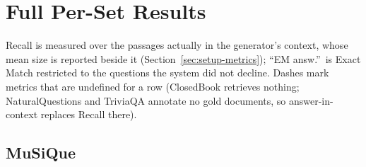 \appendix

\section{Full Per-Set Results}
\label{app:full-tables}

Recall is measured over the passages actually in the generator's context,
whose mean size is reported beside it (Section~\ref{sec:setup-metrics});
``EM answ.''\ is Exact Match restricted to the questions the system did
not decline. Dashes mark metrics that are undefined for a row (ClosedBook
retrieves nothing; NaturalQuestions and TriviaQA annotate no gold
documents, so answer-in-context replaces Recall there).

\subsection{MuSiQue}
